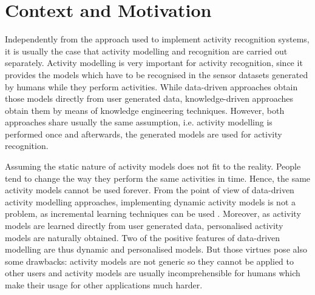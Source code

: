 \section{Context and Motivation}
\label{sec:intro:context}



Independently from the approach used to implement activity recognition systems, it is usually the case that activity modelling and recognition are carried out separately. Activity modelling is very important for activity recognition, since it provides the models which have to be recognised in the sensor datasets generated by humans while they perform activities. While data-driven approaches obtain those models directly from user generated data, knowledge-driven approaches obtain them by means of knowledge engineering techniques. However, both approaches share usually the same assumption, i.e. activity modelling is performed once and afterwards, the generated models are used for activity recognition. 


Assuming the static nature of activity models does not fit to the reality. People tend to change the way they perform the same activities in time. Hence, the same activity models cannot be used forever. From the point of view of data-driven activity modelling approaches, implementing dynamic activity models is not a problem, as incremental learning techniques can be used \cite{Rashidi2011}. Moreover, as activity models are learned directly from user generated data, personalised activity models are naturally obtained. Two of the positive features of data-driven modelling are thus dynamic and personalised models. But those virtues pose also some drawbacks: activity models are not generic so they cannot be applied to other users and activity models are usually incomprehensible for humans which make their usage for other applications much harder.

